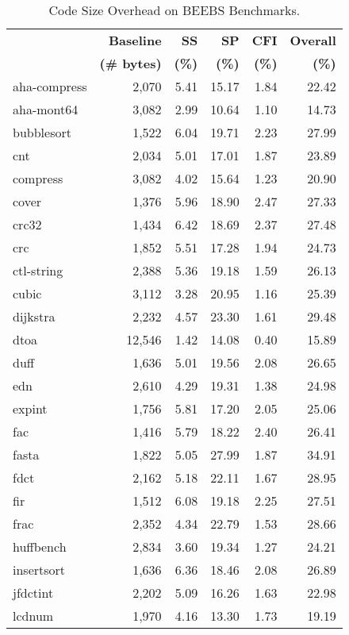 %
%
\begin{table}[ptb]
\caption{Code Size Overhead on BEEBS Benchmarks.}
\centering
\sffamily
\footnotesize{
\begin{tabular}{@{}lrrrrr@{}}
\toprule
& \textbf{Baseline} & \textbf{SS} & \textbf{SP} & \textbf{CFI} & \textbf{Overall} \\
& \textbf{(\# bytes)} & \textbf{(\%)} & \textbf{(\%)} & \textbf{(\%)} & \textbf{(\%)} \\
\midrule
aha-compress & 2,070 & 5.41 & 15.17 & 1.84 & 22.42 \\
aha-mont64 & 3,082 & 2.99 & 10.64 & 1.10 & 14.73 \\
bubblesort & 1,522 & 6.04 & 19.71 & 2.23 & 27.99 \\
cnt & 2,034 & 5.01 & 17.01 & 1.87 & 23.89 \\
compress & 3,082 & 4.02 & 15.64 & 1.23 & 20.90 \\
cover & 1,376 & 5.96 & 18.90 & 2.47 & 27.33 \\
crc32 & 1,434 & 6.42 & 18.69 & 2.37 & 27.48 \\
crc & 1,852 & 5.51 & 17.28 & 1.94 & 24.73 \\
ctl-string & 2,388 & 5.36 & 19.18 & 1.59 & 26.13 \\
cubic & 3,112 & 3.28 & 20.95 & 1.16 & 25.39 \\
dijkstra & 2,232 & 4.57 & 23.30 & 1.61 & 29.48 \\
dtoa & 12,546 & 1.42 & 14.08 & 0.40 & 15.89 \\
duff & 1,636 & 5.01 & 19.56 & 2.08 & 26.65 \\
edn & 2,610 & 4.29 & 19.31 & 1.38 & 24.98 \\
expint & 1,756 & 5.81 & 17.20 & 2.05 & 25.06 \\
fac & 1,416 & 5.79 & 18.22 & 2.40 & 26.41 \\
fasta & 1,822 & 5.05 & 27.99 & 1.87 & 34.91 \\
fdct & 2,162 & 5.18 & 22.11 & 1.67 & 28.95 \\
fir & 1,512 & 6.08 & 19.18 & 2.25 & 27.51 \\
frac & 2,352 & 4.34 & 22.79 & 1.53 & 28.66 \\
huffbench & 2,834 & 3.60 & 19.34 & 1.27 & 24.21 \\
insertsort & 1,636 & 6.36 & 18.46 & 2.08 & 26.89 \\
jfdctint & 2,202 & 5.09 & 16.26 & 1.63 & 22.98 \\
lcdnum & 1,970 & 4.16 & 13.30 & 1.73 & 19.19 \\

\end{tabular}}
\end{table}
